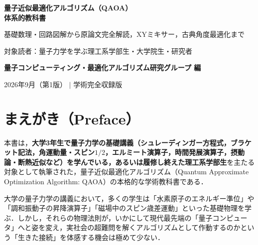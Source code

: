 \documentclass[11pt,a4paper,oneside,openany]{ltjsbook}
\theoremstyle{definition}
\theoremstyle{plain}
\theoremstyle{remark}
\begin{document}
\begin{titlepage}
\centering
\vspace*{35mm}

{\huge\gtfamily\bfseries
量子近似最適化アルゴリズム（QAOA）\\[3mm]体系的教科書
}\par
\vspace{15mm}

{\Large\gtfamily
基礎数理・回路図解から原論文完全解読，XYミキサー，古典角度最適化まで
}\par

\vspace{35mm}

{\normalsize\gtfamily
対象読者：量子力学を学ぶ理工系学部生・大学院生・研究者
}\par

\vfill

{\large\gtfamily\bfseries
量子コンピューティング・最適化アルゴリズム研究グループ 編
}\par
\vspace{6mm}

{\small\color{black!70}
2026年9月（第1版） $\mid$ 学術完全収録版
}\par

\vspace{25mm}
\end{titlepage}

\frontmatter

\chapter*{まえがき（Preface）}

本書は，\textbf{大学3年生で量子力学の基礎講義（シュレーディンガー方程式，ブラケット記法，角運動量・スピン$1/2$，エルミート演算子，時間発展演算子，摂動論・断熱近似など）を学んでいる，あるいは履修し終えた理工系学部生}を主たる対象として執筆された，量子近似最適化アルゴリズム（Quantum Approximate Optimization Algorithm: QAOA\cite{farhi2014quantum}）の本格的な学術教科書である．

大学の量子力学の講義において，多くの学生は「水素原子のエネルギー準位」や「調和振動子の昇降演算子」「磁場中のスピン歳差運動」といった基礎物理を学ぶ．しかし，それらの物理法則が，いかにして現代最先端の「量子コンピュータ」へと姿を変え，実社会の超難問を解くアルゴリズムとして作動するのかという「生きた接続」を体感する機会は極めて少ない．
\end{document}
